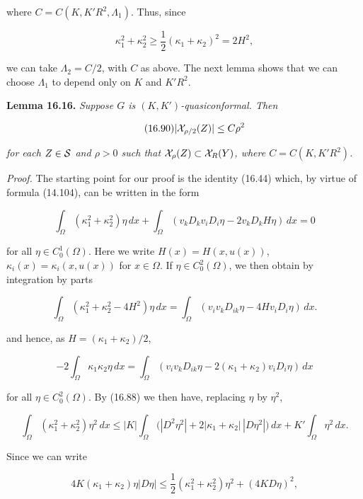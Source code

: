 



where $C = C(K, K'R^2, \Lambda_1)$. Thus, since

\[
\kappa_1^2+\kappa_2^2 \geq \frac12(\kappa_1+\kappa_2)^2 = 2H^2,
\]

we can take $\Lambda_2 = C/2$, with $C$ as above. The next lemma shows that we can choose
\(\Lambda_1\) to depend only on $K$ and $K'R^2$.

\medskip

\noindent\textbf{Lemma 16.16.} \textit{Suppose $G$ is $(K, K')$-quasiconformal. Then}

\begin{equation}
\tag{16.90}
|\mathcal{X}_{\rho/2}(Z)| \leq C\rho^2
\end{equation}

\textit{for each $Z \in \mathcal{S}$ and $\rho > 0$ such that $\mathcal{X}_{\rho}(Z) \subset \mathcal{X}_{R}(Y)$, where $C = C(K, K'R^2)$.}

\medskip

\noindent\textit{Proof.} The starting point for our proof is the identity (16.44) which, by virtue of formula (14.104), can be written in the form

\[
\int_{\Omega} (\kappa_1^2+\kappa_2^2)\eta\,dx + \int_{\Omega} (v_k D_k v_i D_i\eta - 2v_k D_k H\eta)\,dx = 0
\]

for all $\eta \in C_0^1(\Omega)$. Here we write $H(x) = H(x, u(x))$, $\kappa_i(x)=\kappa_i(x, u(x))$ for $x \in \Omega$.
If $\eta \in C_0^2(\Omega)$, we then obtain by integration by parts

\[
\int_{\Omega} (\kappa_1^2+\kappa_2^2-4H^2)\eta\,dx = \int_{\Omega} (v_i v_k D_{ik}\eta - 4Hv_i D_i\eta)\,dx.
\]

and hence, as $H=(\kappa_1+\kappa_2)/2$,

\[
-2\int_{\Omega}\kappa_1\kappa_2\eta\,dx = \int_{\Omega} (v_i v_k D_{ik}\eta - 2(\kappa_1+\kappa_2)v_i D_i\eta)\,dx
\]

for all $\eta \in C_0^2(\Omega)$. By (16.88) we then have, replacing $\eta$ by $\eta^2$,

\[
\int_{\Omega} (\kappa_1^2+\kappa_2^2)\eta^2\,dx \leq |K|\int_{\Omega} \bigl(|D^2\eta^2|+2|\kappa_1+\kappa_2|\,|D\eta^2|\bigr)\,dx + K'\int_{\Omega}\eta^2\,dx.
\]

Since we can write

\[
4K(\kappa_1+\kappa_2)\eta |D\eta|
\leq \frac12(\kappa_1^2+\kappa_2^2)\eta^2 + (4KD\eta)^2,
\]

